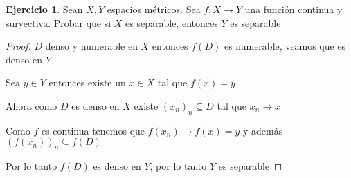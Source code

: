 \documentclass[12pt]{article}
\newcommand{\ra}{\rightarrow}
\theoremstyle{definition}
\newtheorem{ej}{Ejercicio}
\begin{document}
\begin{ej}
  Sean $X,Y$ espacios métricos. Sea $f: X \ra Y$ una función continua y suryectiva. Probar que si $X$ es separable, entonces $Y$ es separable
  \begin{proof}
    $D$ denso y numerable en $X$ entonces $f(D)$ es numerable, veamos que es denso en $Y$

    Sea $y \in Y$ entonces existe un $x \in X$ tal que $f(x) = y$ 

  Ahora como $D$ es denso en $X$ existe $(x_n)_n \subseteq D$ tal que $x_n \ra x$ 

  Como $f$ es continua tenemos que $f(x_n) \ra f(x) = y$ y además $(f(x_n))_n \subseteq f(D)$

  Por lo tanto $f(D)$ es denso en $Y$, por lo tanto $Y$ es separable

  \end{proof}
\end{ej}
\end{document}
